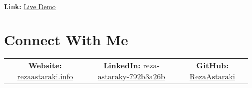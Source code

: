 \documentclass[a4paper,11pt]{article}
\begin{document}
\textbf{Link:} \href{https://ai-cv-builder-five.vercel.app/}{Live Demo}

\vspace{10pt}

\section*{Connect With Me}

\begin{center}
\begin{tabular}{c c c}
  \textbf{Website:} \href{https://rezaastaraki.info/}{rezaastaraki.info} & 
  \textbf{LinkedIn:} \href{https://www.linkedin.com/in/reza-astaraky-792b3a26b}{reza-astaraky-792b3a26b} & 
  \textbf{GitHub:} \href{https://github.com/RezaAstaraki}{RezaAstaraki}
\end{tabular}
\end{center}
\end{document}
